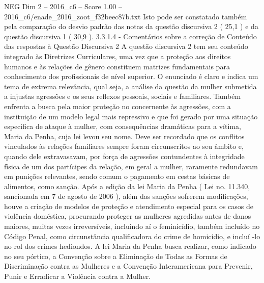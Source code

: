 \begin{textsample}{NEG Dim 2 – 2016\_c6 – Score 1.00 – 2016\_c6/enade\_2016\_zoot\_f32beec87b.txt}
Isto pode ser constatado também pela comparação do desvio padrão das notas da questão discursiva 2 ( 25,1 ) e da questão discursiva 1 ( 30,9 ). 3.3.1.4 - Comentários sobre a correção de Conteúdo das respostas à Questão Discursiva 2 A questão discursiva 2 tem seu conteúdo integrado às Diretrizes Curriculares, uma vez que a proteção aos direitos humanos e às relações de gênero constituem matrizes fundamentais para conhecimento dos profissionais de nível superior.
O enunciado é claro e indica um tema de extrema relevância, qual seja, a análise da questão da mulher submetida a injustas agressões e os seus reflexos pessoais, sociais e familiares.
Também enfrenta a busca pela maior proteção no concernente às agressões, com a instituição de um modelo legal mais repressivo e que foi gerado por uma situação especifica de ataque à mulher, com consequências dramáticas para a vítima, Maria da Penha, cuja lei levou seu nome.
Deve ser recordado que os conflitos vinculados às relações familiares sempre foram circunscritos ao seu âmbito e, quando dele extravasavam, por força de agressões contundentes à integridade física de um dos partícipes da relação, em geral a mulher, raramente redundavam em punições relevantes, sendo comum o pagamento em cestas básicas de alimentos, como sanção.
Após a edição da lei Maria da Penha ( Lei no. 11.340, sancionada em 7 de agosto de 2006 ), além das sanções sofrerem modificações, houve a criação de modelos de proteção e atendimento especial para os casos de violência doméstica, procurando proteger as mulheres agredidas antes de danos maiores, muitas vezes irreversíveis, incluindo aí o feminicídio, também incluído no Código Penal, como circunstância qualificadora do crime de homicídio, e incluí -lo no rol dos crimes hediondos.
A lei Maria da Penha busca realizar, como indicado no seu pórtico, a Convenção sobre a Eliminação de Todas as Formas de Discriminação contra as Mulheres e a Convenção Interamericana para Prevenir, Punir e Erradicar a Violência contra a Mulher.

\end{textsample}
